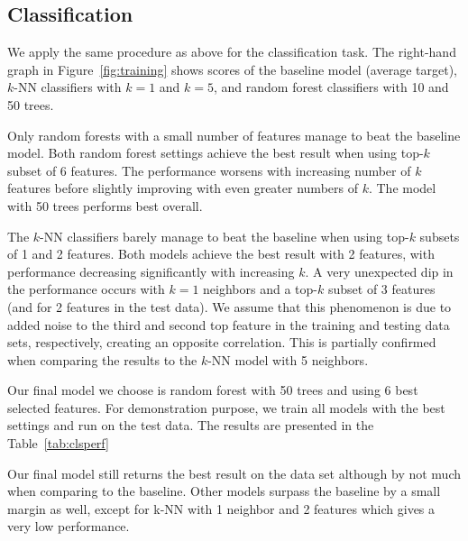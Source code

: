 \subsection{Classification}

We apply the same procedure as above for the classification task.  The
right-hand graph in Figure~\ref{fig:training} shows \fmeasure{} scores of the
baseline model (average target), $k$-NN classifiers with $k = 1$ and $k = 5$,
and random forest classifiers with 10 and 50 trees.

Only random forests with a small number of features manage to beat the baseline
model.  Both random forest settings achieve the best result when using top-$k$
subset of 6 features.  The performance worsens with increasing number of $k$
features before slightly improving with even greater numbers of $k$.  The model
with 50 trees performs best overall.

The $k$-NN classifiers barely manage to beat the baseline when using top-$k$
subsets of 1 and 2 features.  Both models achieve the best result with 2
features, with performance decreasing significantly with increasing $k$.  A very
unexpected dip in the performance occurs with $k = 1$ neighbors and a top-$k$
subset of 3 features (and for 2 features in the test data).  We assume that this
phenomenon is due to added noise to the third and second top feature in the
training and testing data sets, respectively, creating an opposite correlation.
This is partially confirmed when comparing the results to the $k$-NN model with
5 neighbors.

Our final model we choose is random forest with 50 trees and using 6 best
selected features. For demonstration purpose, we train all models with the best
settings and run on the test data. The results are presented in the
Table~\ref{tab:clsperf}

Our final model still returns the best result on the data set although by not
much when comparing to the baseline. Other models surpass the baseline by a
small margin as well, except for k-NN with 1 neighbor and 2 features which gives
a very low performance.

